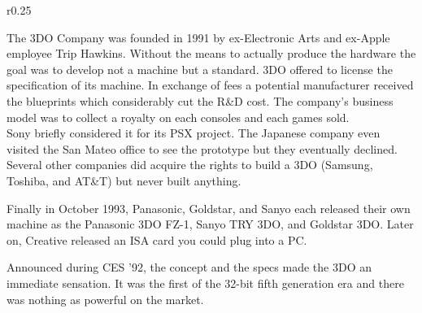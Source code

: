 \begin{wrapfigure}[14]{r}{0.25\textwidth}{
\centering {}}
\end{wrapfigure}
The 3DO Company was founded in 1991 by ex-Electronic Arts and ex-Apple employee Trip Hawkins. Without the means to actually produce the hardware the goal was to develop not a machine but a standard. 3DO offered to license the specification of its machine. In exchange of fees a potential manufacturer received the blueprints which considerably cut the R\&D cost. The company's business model was to collect a royalty on each consoles and each games sold.\\

 Sony briefly considered it for its PSX project. The Japanese company even visited the San Mateo office to see the prototype but they eventually declined. Several other companies did acquire the rights to build a 3DO (Samsung, Toshiba, and AT\&T) but never built anything.\\
 \par
Finally in October 1993, Panasonic, Goldstar, and Sanyo each released their own machine as the Panasonic 3DO FZ-1, Sanyo TRY 3DO, and Goldstar 3DO. Later on, Creative released an ISA card you could plug into a PC.\\
\par
{}
\par
{}

















Announced during CES '92, the concept and the specs made the 3DO an immediate sensation. It was the first of the 32-bit fifth generation era and there was nothing as powerful on the market.\\
\par


\\

